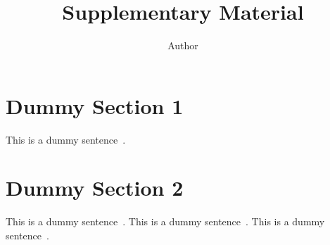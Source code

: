 \documentclass[twocolumn]{article}
\title{Supplementary Material}
\author{Author}
\begin{document}
\maketitle



\begin{appendices}



\renewcommand{\thealgorithm}{S\arabic{algorithm}}
\renewcommand{\thefigure}{S\arabic{figure}}
\renewcommand{\thesection}{S\arabic{section}}
\renewcommand{\thetable}{S\arabic{table}}



\section{Dummy Section 1}
\label{sec:dummy1}

This is a dummy sentence~\cite{Authors14}.
 \section{Dummy Section 2}
\label{sec:dummy2}

This is a dummy sentence~\cite{Alpher02}. This is a dummy sentence~\cite{Alpher03}. This is a dummy sentence~\cite{Alpher04}.
 
\end{appendices}
 




\end{document}
